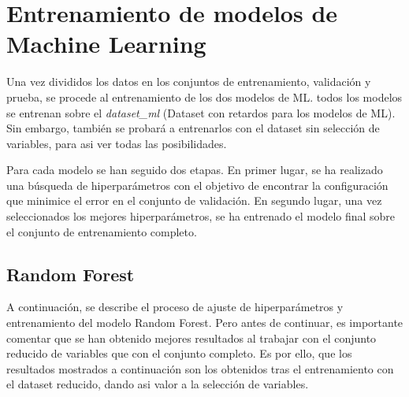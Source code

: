 \section{Entrenamiento de modelos de Machine Learning}
\label{sec:entrenamiento_ML}
Una vez divididos los datos en los conjuntos de entrenamiento, validación y prueba, se procede al entrenamiento de los dos modelos de ML. todos los modelos se entrenan sobre el \emph{dataset\_ml} (Dataset con retardos para los modelos de ML). Sin embargo, también se probará a entrenarlos con el dataset sin selección de variables, para asi ver todas las posibilidades.

Para cada modelo se han seguido dos etapas. En primer lugar, se ha realizado una búsqueda de hiperparámetros con el objetivo de encontrar la configuración que minimice el error en el conjunto de validación. En segundo lugar, una vez seleccionados los mejores hiperparámetros, se ha entrenado el modelo final sobre el conjunto de entrenamiento completo. 

\subsection{Random Forest}
A continuación, se describe el proceso de ajuste de hiperparámetros y entrenamiento del modelo Random Forest. Pero antes de continuar, es importante comentar que se han obtenido mejores resultados al trabajar con el conjunto reducido de variables que con el conjunto completo. Es por ello, que los resultados mostrados a continuación son los obtenidos tras el entrenamiento con el dataset reducido, dando asi valor a la selección de variables. 

